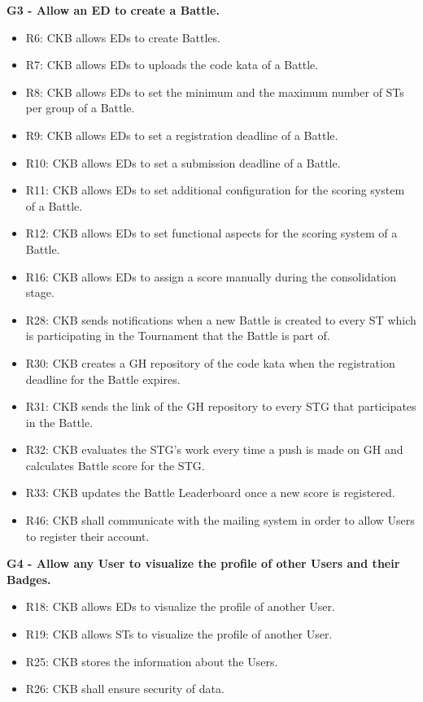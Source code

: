 \vspace{1.5cm}
\textbf{G3 - Allow an ED to create a Battle.}
\begin{itemize}
    \item R6: CKB allows EDs to create Battles.
    \item R7: CKB allows EDs to uploads the code kata of a Battle.
    \item R8: CKB allows EDs to set the minimum and the maximum number of STs per group of a Battle.
    \item R9: CKB allows EDs to set a registration deadline of a Battle.
    \item R10: CKB allows EDs to set a submission deadline of a Battle.
    \item R11: CKB allows EDs to set additional configuration for the scoring system of a Battle.
    \item R12: CKB allows EDs to set functional aspects for the scoring system of a Battle.
    \item R16: CKB allows EDs to assign a score manually during the consolidation stage.
    \item R28: CKB sends notifications when a new Battle is created to every ST which is participating in the Tournament that the Battle is part of.
    \item R30: CKB creates a GH repository of the code kata when the registration deadline for the Battle expires.
    \item R31: CKB sends the link of the GH repository to every STG that participates in the Battle.
    \item R32: CKB evaluates the STG's work every time a push is made on GH and calculates Battle score for the STG.
    \item R33: CKB updates the Battle Leaderboard once a new score is registered.
    \item R46: CKB shall communicate with the mailing system in order to allow Users to register their account.
\end{itemize}


\vspace{1.5cm}
\textbf{G4 - Allow any User to visualize the profile of other Users and their Badges.}
\begin{itemize}
    \item R18: CKB allows EDs to visualize the profile of another User.
    \item R19: CKB allows STs to visualize the profile of another User.
    \item R25: CKB stores the information about the Users.
    \item R26: CKB shall ensure security of data. 
\end{itemize}


